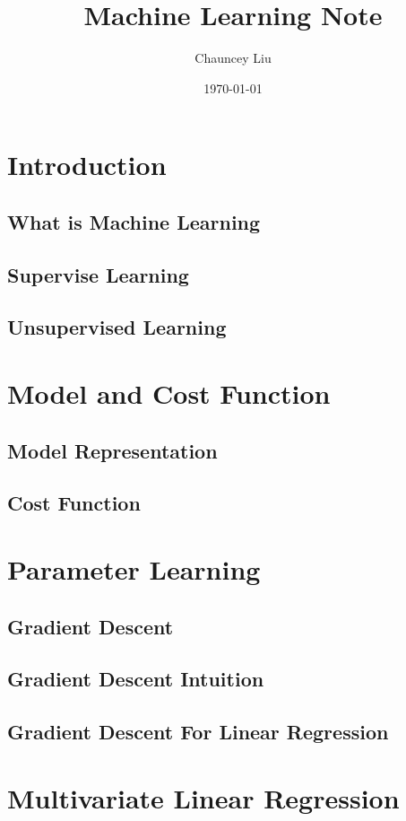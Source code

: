\documentclass{article}
\title{\textbf{Machine Learning Note}}
\author{Chauncey Liu}
\date{\today}
\begin{document}
 
\maketitle
 
\tableofcontents

\newpage
 
\section{Introduction}
\subsection{What is Machine Learning}
\subsection{Supervise Learning}
\subsection{Unsupervised Learning}

\section{Model and Cost Function}
\subsection{Model Representation}
\subsection{Cost Function}

\section{Parameter Learning}
\subsection{Gradient Descent}
\subsection{Gradient Descent Intuition}
\subsection{Gradient Descent For Linear Regression}

\section{Multivariate Linear Regression}
\end{document}
